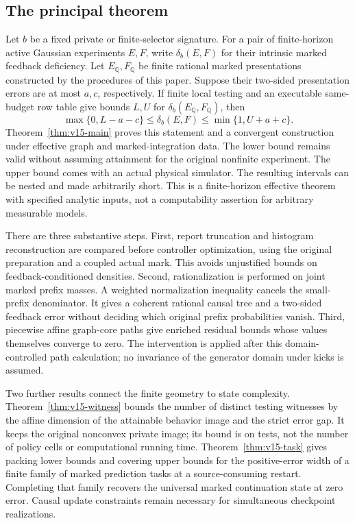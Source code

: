 \subsection{The principal theorem}
Let $b$ be a fixed private or finite-selector signature. For a pair of
finite-horizon active Gaussian experiments $E,F$, write
$\delta_b(E,F)$ for their intrinsic marked feedback deficiency. Let
$E_{\mathbb Q},F_{\mathbb Q}$ be finite rational marked presentations
constructed by the procedures of this paper. Suppose their two-sided
presentation errors are at most $a,c$, respectively. If finite local
testing and an executable same-budget row table give bounds $L,U$ for
$\delta_b(E_{\mathbb Q},F_{\mathbb Q})$, then
\begin{equation}\label{eq:v15-intro}
 \max\{0,L-a-c\}\le\delta_b(E,F)\le\min\{1,U+a+c\}.
\end{equation}
Theorem~\ref{thm:v15-main} proves this statement and a convergent
construction under effective graph and marked-integration data. The
lower bound remains valid without assuming attainment for the original
nonfinite experiment. The upper bound comes with an actual physical
simulator. The resulting intervals can be nested and made arbitrarily
short. This is a finite-horizon effective theorem with specified analytic
inputs, not a computability assertion for arbitrary measurable models.

There are three substantive steps. First, report truncation and histogram
reconstruction are compared before controller optimization, using the
original preparation and a coupled actual mark. This avoids unjustified
bounds on feedback-conditioned densities. Second, rationalization is
performed on joint marked prefix masses. A weighted normalization
inequality cancels the small-prefix denominator. It gives a coherent
rational causal tree and a two-sided feedback error without deciding
which original prefix probabilities vanish. Third, piecewise affine
graph-core paths give enriched residual bounds whose values themselves
converge to zero. The intervention is applied after this domain-controlled
path calculation; no invariance of the generator domain under kicks
is assumed.

Two further results connect the finite geometry to state complexity.
Theorem~\ref{thm:v15-witness} bounds the number of distinct testing
witnesses by the affine dimension of the attainable behavior image and
the strict error gap. It keeps the original nonconvex private image;
its bound is on tests, not the number of policy cells or computational
running time. Theorem~\ref{thm:v15-task} gives packing lower bounds and
covering upper bounds for the positive-error width of a finite family
of marked prediction tasks at a source-consuming restart. Completing
that family recovers the universal marked continuation state at zero
error. Causal update constraints remain necessary for simultaneous
checkpoint realizations.

